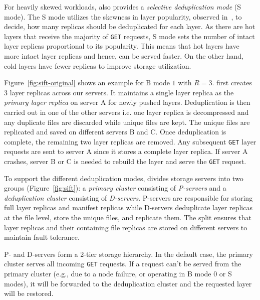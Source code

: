 For heavily skewed workloads, \sysname also provides a \emph{selective
deduplication mode} (S mode).
%
The S mode utilizes the skewness in layer popularity, observed
in~\cite{dockerworkload}, to decide, how many replicas should be deduplicated
for each layer.
%
As there are hot layers that receive the majority of \texttt{GET} requests,
S mode sets the number of intact layer replicas proportional to its
popularity.
%
This means that hot layers have more intact layer replicas and
hence, can be served faster.
%
On the other hand, cold layers have fewer replicas to improve storage utilization.

Figure~\ref{fig:sift-original} shows an example for B mode $1$ with $R=3$.
\sysname first creates 3 layer replicas across our servers. It maintains a single layer replica as the \emph{primary layer replica} on
server A for newly pushed layers.
%
Deduplication is then carried out in one of the other servers i.e. one layer replica is decompressed and any duplicate
files are discarded while unique files are kept.  The unique files are replicated
and saved on different servers B and C. Once deduplication is complete, the remaining two layer replicas are removed. 
%
Any subsequent \texttt{GET} layer requests are sent to server A since it
stores a complete layer replica.
%
If server A crashes, server B or C is needed to rebuild the layer and serve the
\texttt{GET} request.

To support the different deduplication modes, \sysname divides storage servers
into two groups (Figure~\ref{fig:sift}): a \emph{primary cluster}
consisting of \emph{P-servers} and a \emph{deduplication cluster} consisting of
\emph{D-servers}.
%
P-servers are responsible for storing full layer replicas and manifest replicas
while D-servers deduplicate layer replicas at the file level, store the unique
files, and replicate them.
%
The split ensures that layer replicas and their containing file
replicas are stored on different servers to maintain fault tolerance.


P- and D-servers form a 2-tier storage hierarchy. In the default case,
the primary cluster serves all incoming \texttt{GET} requests.
%
If a request can't be served from the primary cluster (e.g., due to a
node failure, or \sysname operating in B mode 0 or S modes),
it will be forwarded to the deduplication cluster and the requested
layer will be restored.
%
%





